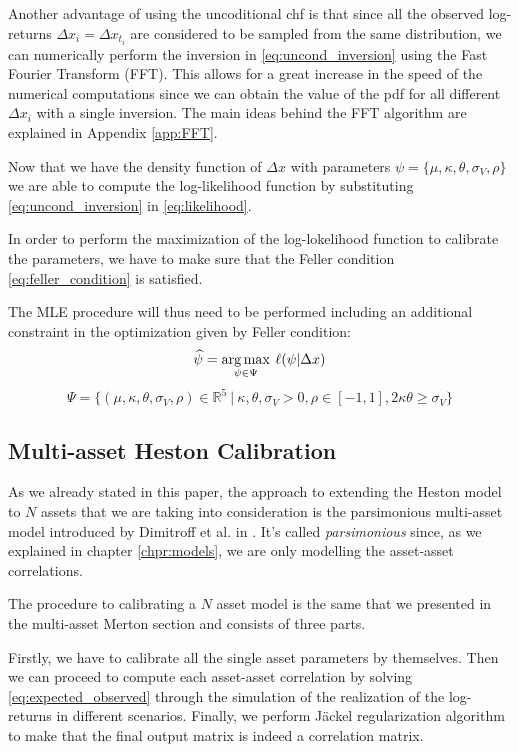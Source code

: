 Another advantage of using the uncoditional chf is that since all the observed log-returns $\Delta x_i = \Delta x_{t_i} $ are considered to be sampled from the same distribution, we can numerically perform the inversion in \eqref{eq:uncond_inversion} using the Fast Fourier Transform (FFT). This allows for a great increase in the speed of the numerical computations since we can obtain the value of the pdf for all different $\Delta x_i$ with a single inversion.
The main ideas behind the FFT algorithm are explained in Appendix \ref{app:FFT}.


Now that we have the density function of $\Delta x$ with parameters $\psi = \{\mu, \kappa, \theta, \sigma_V, \rho \}$ we are able to compute the log-likelihood function by substituting \eqref{eq:uncond_inversion} in \eqref{eq:likelihood}.


In order to perform the maximization of the log-lokelihood function to calibrate the parameters, we have to make sure that the Feller condition \eqref{eq:feller_condition} is satisfied.

The MLE procedure will thus need to be performed including an additional constraint in the optimization given by Feller condition:
\begin{equation}
\widehat{\psi} = \operatorname*{arg\,max}_{\psi \in \Psi} \:\ell(\psi |  \Delta x)
\end{equation}
\begin{equation}
	\Psi = \{ (\mu, \kappa, \theta, \sigma_V, \rho) \in \mathbb{R}^5 \: |\: \kappa,\theta,\sigma_V >0, \rho \in [-1,1], 2\kappa\theta \geq \sigma_V \}
\end{equation}

\subsection{Multi-asset Heston Calibration}
\label{sec:multi_heston_cal}
As we already stated in this paper, the approach to extending the Heston model to $N$ assets that we are taking into consideration is the parsimonious multi-asset model introduced by Dimitroff et al. in \citep{PARSIMONIOUS2011}.
It's called \textit{parsimonious} since, as we explained in chapter \ref{chpr:models}, we are only modelling the asset-asset correlations.

The procedure to calibrating a $N$ asset model is the same that we presented in the multi-asset Merton section and consists of three parts.

Firstly, we have to calibrate all the single asset parameters by themselves. Then we can proceed to compute each asset-asset correlation by solving \eqref{eq:expected_observed} through the simulation of the realization of the log-returns in different scenarios.
Finally, we perform J\"ackel regularization algorithm to make that the final output matrix is indeed a correlation matrix.


